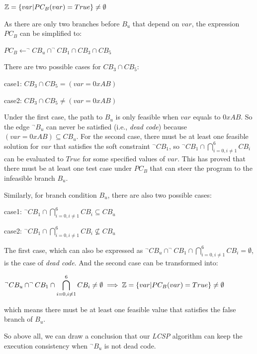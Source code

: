 \begin{center}
$\mathbb{Z}=\{var\arrowvert PC_B(var) = True\} \neq \emptyset$
\end{center}

As there are only two branches before $B_u$ that depend on $var$, 
the expression $PC_B$ can be simplified to:
\begin{center}
$PC_B\leftarrow^\neg CB_u \cap ^\neg CB_1 \cap CB_3 \cap CB_5$
\end{center}

There are two possible cases for $CB_3 \cap CB_5$:
\begin{center}
case1: $CB_3 \cap CB_5 = (var = 0xAB)$

case2: $CB_3 \cap CB_5 \neq (var = 0xAB)$
\end{center}

Under the first case, the path to $B_u$ is only feasible when 
$var$ equals to $0xAB$. So the edge $^\neg B_u$ can never be 
satisfied (i.e., \emph{dead code}) because $(var = 0xAB) \subseteq CB_u$. 
For the second case, there must be at least one feasible solution 
for $var$ that satisfies the soft constraint $^\neg CB_1$, so 
$^\neg CB_1 \cap \bigcap_{i=0,i \neq 1}^{6} CB_i$ can be evaluated 
to $True$ for some specified values of $var$. This has proved that 
there must be at least one test case under $PC_B$ that can steer 
the program to the infeasible branch $B_u$.

Similarly, for branch condition $B_u$, there are also two possible cases:
\begin{center}
case1: $\displaystyle ^\neg CB_1 \cap \bigcap\limits_{i=0,i\neq 1}^6 CB_i \subseteq CB_u$

case2: $\displaystyle ^\neg CB_1 \cap \bigcap\limits_{i=0,i\neq 1}^6 CB_i \nsubseteq CB_u$
\end{center}

The first case, which can also be expressed as 
$^\neg CB_u \cap ^\neg CB_1 \cap \bigcap_{i=0,i\neq 1}^6 CB_i = \emptyset$, 
is the case of \emph{dead code}. And the second case can be transformed into:
\begin{center}
$\displaystyle ^\neg CB_u \cap ^\neg CB_1 \cap \bigcap\limits_{i=0,i\neq 1}^6 CB_i \neq \emptyset \implies \mathbb{Z} = \{var\arrowvert PC_B(var) = True\} \neq \emptyset$
\end{center}

\noindent which means there must be at least one feasible value 
that satisfies the false branch of $B_u$.

So above all, we can draw a conclusion that our \emph{LCSP} algorithm 
can keep the execution consistency when $^\neg B_u$ is not dead code.

